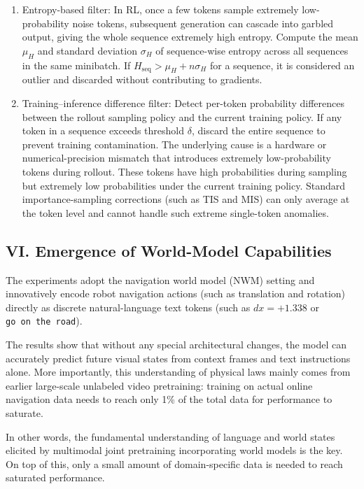 \begin{enumerate}
\def\labelenumi{\arabic{enumi}.}
\tightlist
\item
  Entropy-based filter: In RL, once a few tokens sample extremely low-probability noise tokens, subsequent generation can cascade into garbled output, giving the whole sequence extremely high entropy. Compute the mean \(\mu_H\) and standard deviation \(\sigma_H\) of sequence-wise entropy across all sequences in the same minibatch. If \(H_{\mathrm{seq}}>\mu_H+n\sigma_H\) for a sequence, it is considered an outlier and discarded without contributing to gradients.
\item
  Training--inference difference filter: Detect per-token probability differences between the rollout sampling policy and the current training policy. If any token in a sequence exceeds threshold \(\delta\), discard the entire sequence to prevent training contamination. The underlying cause is a hardware or numerical-precision mismatch that introduces extremely low-probability tokens during rollout. These tokens have high probabilities during sampling but extremely low probabilities under the current training policy. Standard importance-sampling corrections (such as TIS and MIS) can only average at the token level and cannot handle such extreme single-token anomalies.
\end{enumerate}

\hypertarget{vi.-emergence-of-world-model-capabilities}{%
\subsection{VI. Emergence of World-Model Capabilities}\label{vi.-emergence-of-world-model-capabilities}}

The experiments adopt the navigation world model (NWM) setting and innovatively encode robot navigation actions (such as translation and rotation) directly as discrete natural-language text tokens (such as \(dx=+1.338\) or \texttt{go\ on\ the\ road}).

The results show that without any special architectural changes, the model can accurately predict future visual states from context frames and text instructions alone. More importantly, this understanding of physical laws mainly comes from earlier large-scale unlabeled video pretraining: training on actual online navigation data needs to reach only 1\% of the total data for performance to saturate.

In other words, the fundamental understanding of language and world states elicited by multimodal joint pretraining incorporating world models is the key. On top of this, only a small amount of domain-specific data is needed to reach saturated performance.

